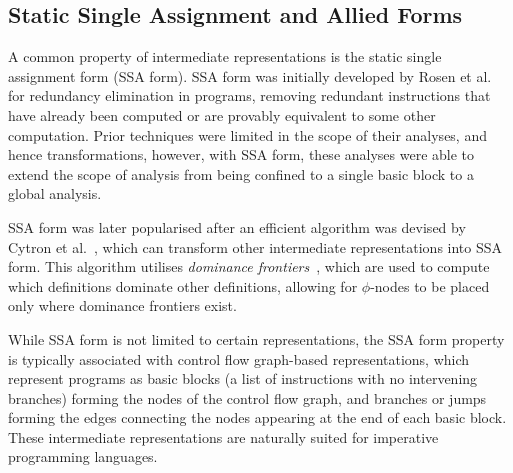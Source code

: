 \subsection{Static Single Assignment and Allied Forms}
\label{ssec:lit-review--ssa}

A common property of intermediate representations is the static single assignment form (SSA form). SSA form was initially developed by Rosen et al.~\cite{rosen1988global} for redundancy elimination in programs, removing redundant instructions that have already been computed or are provably equivalent to some other computation. Prior techniques were limited in the scope of their analyses, and hence transformations, however, with SSA form, these analyses were able to extend the scope of analysis from being confined to a single basic block to a global analysis. 

SSA form was later popularised after an efficient algorithm was devised by Cytron et al.~\cite{cytron1991efficiently}, which can transform other intermediate representations into SSA form. This algorithm utilises \textit{dominance frontiers}~\cite{prosser1959applications, lowry1969object}, which are used to compute which definitions dominate other definitions, allowing for $\phi$-nodes to be placed only where dominance frontiers exist. 

While SSA form is not limited to certain representations, the SSA form property is typically associated with control flow graph-based representations, which represent programs as basic blocks (a list of instructions with no intervening branches) forming the nodes of the control flow graph, and branches or jumps forming the edges connecting the nodes appearing at the end of each basic block. These intermediate representations are naturally suited for imperative programming languages.

